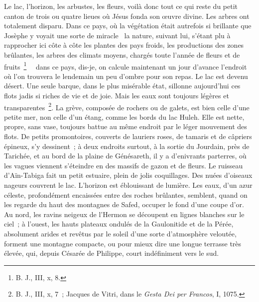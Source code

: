 \documentclass[french,twoside]{book} %
\begin{document}
Le lac, l’horizon, les arbustes, les fleurs, voilà donc tout ce qui reste du petit canton de trois ou quatre lieues où Jésus fonda son œuvre divine. Les arbres ont totalement disparu. Dans ce pays, où la végétation était autrefois si brillante que Josèphe y voyait une sorte de miracle  la nature, suivant lui, s’étant plu à rapprocher ici côte à côte les plantes des pays froids, les productions des zones brûlantes, les arbres des climats moyens, chargés toute l’année de fleurs et de fruits \footnote{ B. J., III, x, 8.}   dans ce pays, dis-je, on calcule maintenant un jour d’avance l’endroit où l’on trouvera le lendemain un peu d’ombre pour son repas. Le lac est devenu désert. Une seule barque, dans le plus misérable état, sillonne aujourd’hui ces flots jadis si riches de vie et de joie. Mais les eaux sont toujours légères et transparentes \footnote{ B. J., III, x, 7 ; Jacques de Vitri, dans le {\itshape Gesta Dei per Francos}, I, 1075.}. La grève, composée de rochers ou de galets, est bien celle d’une petite mer, non celle d’un étang, comme les bords du lac Huleh. Elle est nette, propre, sans vase, toujours battue au même endroit par le léger mouvement des flots. De petits promontoires, couverts de lauriers roses, de tamaris et de câpriers épineux, s’y dessinent ; à deux endroits surtout, à la sortie du Jourdain, près de Tarichée, et au bord de la plaine de Génésareth, il y a d’enivrants parterres, où les vagues viennent s’éteindre en des massifs de gazon et de fleurs. Le ruisseau d’Aïn-Tabiga fait un petit estuaire, plein de jolis coquillages. Des nuées d’oiseaux nageurs couvrent le lac. L’horizon est éblouissant de lumière. Les eaux, d’un azur céleste, profondément encaissées entre des roches brûlantes, semblent, quand on les regarde du haut des montagnes de Safed, occuper le fond d’une coupe d’or. Au nord, les ravins neigeux de l’Hermon se découpent en lignes blanches sur le ciel ; à l’ouest, les hauts plateaux ondulés de la Gaulonitide et de la Pérée, absolument arides et revêtus par le soleil d’une sorte d’atmosphère veloutée, forment une montagne compacte, ou pour mieux dire une longue terrasse très élevée, qui, depuis Césarée de Philippe, court indéfiniment vers le sud.\par
\end{document}

